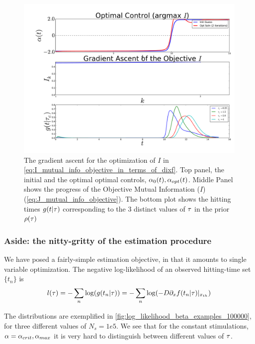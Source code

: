 \begin{figure}[htp]
\begin{center}
  \includegraphics[width=1\textwidth]{Figs/FP_Adjoint/OptControl_MI_HT_4.pdf}
  \caption[labelInTOC]{The gradient ascent for the optimization of $I$ in
  \cref{eq:I_mutual_info_objective_in_terms_of_dixf}. Top panel, the initial and
  the optimal optimal controls, $\alpha_{0}(t), \alpha_{opt}(t)$. Middle Panel
  shows the progress of the Objective Mutual Information ($I$) 
  (\cref{eq:J_mutual_info_objective}). 
  The bottom plot shows the hitting times $g(t| { \tau })$ corresponding to the 3
  distinct values of ${ \tau }$ in the prior $\rho({ \tau })$}  
  \label{fig:hitting_time_density_g_aopt_bprior}  
\end{center}   
\end{figure}  

\subsubsection{Aside: the nitty-gritty of the estimation procedure}
We have posed a fairly-simple estimation objective, in that it amounts to single
variable optimization. The negative log-likelihood of an observed hitting-time
set $\{t_n\}$ is
\begin{equation}
l({ \tau }) = - \sum_n \log ( g(t_n | { \tau }) ) =  - \sum_n \log ( -D {\partial}_x f(t_n |
{ \tau }) |_{{ x_{th} }} )
\end{equation}

The distributions are exemplified in
\cref{fig:log_likelihood_beta_examples_100000},
for three different values of $N_s =  1e5$. We see that for the constant
stimulations, $\alpha = \alpha_{crit}, \alpha_{max}$ it is very hard to
distinguish between different values of ${ \tau }$. 

